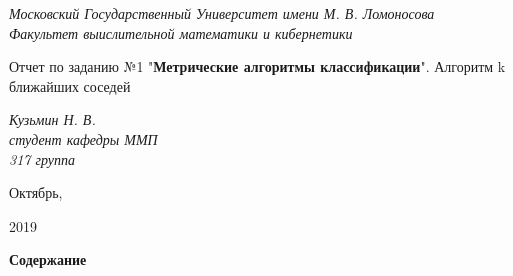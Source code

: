 \documentclass[a4paper, 12pt]{article}
\begin{document}
    
    \thispagestyle{empty}
    \begin{center}
        \textit{Московский Государственный Университет имени М. В. Ломоносова\\
            Факультет выислительной математики и кибернетики}
        \vspace{0.5ex}
        \vspace{30ex}
        
        Отчет по заданию №1 "\textbf{Метрические алгоритмы классификации}". Алгоритм k ближайших соседей
        
    \end{center}
    \vspace{13ex}
    \begin{flushright}
        \noindent %
        \vfill
        \textit{Кузьмин Н. В.}
        \\
        \textit{студент кафедры ММП \\ 317 группа}
        
    \end{flushright}
    \begin{center}
        Октябрь,
        
        2019
    \end{center}
    \newpage
    \begin{center}
        \textbf{Содержание}
    \end{center}
\end{document}
